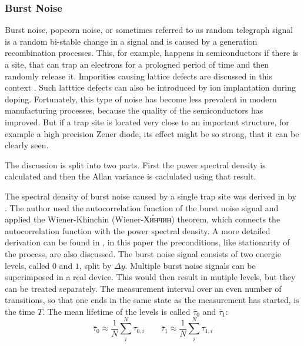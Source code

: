 \clearpage
\subsubsection{Burst Noise}
\label{sec:theory_burst_noise}
Burst noise, popcorn noise, or sometimes referred to as random telegraph signal is a random bi-stable change in a signal and is caused by a generation recombination processes. This, for example, happens in semiconductors if there is a site, that can trap an electrons for a prologned period of time and then randomly release it. Imporities causing lattice defects are discussed in this context \cite{kay2012operational,burst_noise_psd,popcorn_noise_orgin,technote_ti_popcorn_noise}. Such latttice defects can also be introduced by ion implantation during doping. Fortunately, this type of noise has become less prevalent in modern manufacturing processes, because the quality of the semiconductors has improved. But if a trap site is located very close to an important structure, for example a high precision Zener diode, its effect might be so strong, that it can be clearly seen.

The discussion is split into two parts. First the power spectral density is calculated and then the Allan variance is caclulated using that result.

The spectral density of burst noise caused by a single trap site was derived in \cite{burst_noise_wiener_khinchin} by \citeauthor{burst_noise_wiener_khinchin}. The author used the autocorrelation function of the burst noise signal and applied the Wiener-Khinchin (Wiener-Хи́нчин) theorem, which connects the autocorrelation function with the power spectral density. A more detailed derivation can be found in \cite{fundamentals_of_noise_processes}, in this paper the preconditions, like stationarity of the process, are also discussed. The burst noise signal consists of two energie levels, called $0$ and $1$, split by $\Delta y$. Multiple burst noise signals can be superimposed in a real device. This would then result in mutiple levels, but they can be treated separately. The measurement interval over an even number of transitions, so that one ends in the same state as the measurement has started, is the time $T$. The mean lifetime of the levels is called $\bar \tau_0$ and $\bar \tau_1$:
\begin{equation}
    \bar \tau_{0} \approx \frac 1 N \sum_{i}^N \tau_{0,i} \qquad \bar \tau_{1} \approx \frac 1 N \sum_{i}^N \tau_{1,i}
\end{equation}

